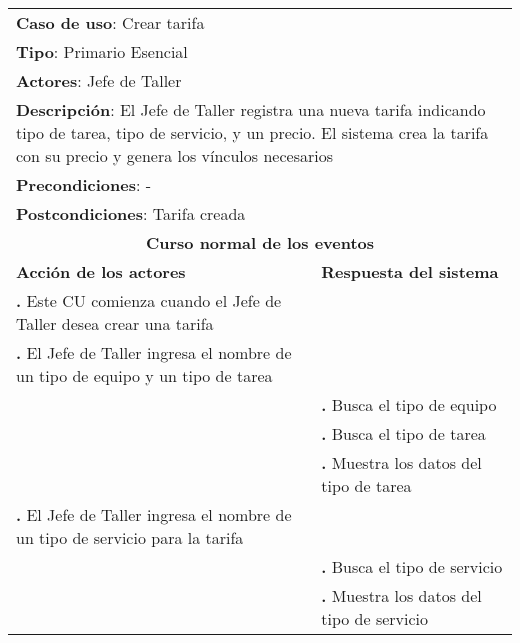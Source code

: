 \documentclass[12pt]{extarticle}
\begin{document}
    \newcommand\inc{\stepcounter{step}\textbf{\thestep. }}
    \newcommand\resetinc{\setcounter{step}{0}}
    \newcommand\raya{\noindent\rule{169mm}{0.8mm}\\}


	\begin{longtable}{ |p{8cm}|p{8cm}| }
		\hline
		\multicolumn{2}{|p{16cm}|}{\textbf{Caso de uso}: Crear tarifa}\\
		\multicolumn{2}{|p{16cm}|}{\textbf{Tipo}: Primario Esencial}\\
		\multicolumn{2}{|p{16cm}|}{\textbf{Actores}: Jefe de Taller}\\
		\multicolumn{2}{|p{16cm}|}{\textbf{Descripción}: El Jefe de Taller registra una nueva tarifa indicando tipo de tarea, tipo de servicio, y un precio. El sistema crea la tarifa con su precio y genera los vínculos necesarios}\\
		\multicolumn{2}{|p{16cm}|}{\textbf{Precondiciones}: -}\\
		\multicolumn{2}{|p{16cm}|}{\textbf{Postcondiciones}: Tarifa creada}\\
		\hline
		\multicolumn{2}{|c|}{\textbf{Curso normal de los eventos}}\\
		\hline
		\textbf{Acción de los actores} & \textbf{Respuesta del sistema}\\
		\hline

			\inc Este CU comienza cuando el Jefe de Taller desea crear una tarifa& \\
			\hline
            \inc El Jefe de Taller ingresa el nombre de un tipo de equipo y un tipo de tarea& \\
			\hline
            & \inc Busca el tipo de equipo \\
			\hline
			& \inc Busca el tipo de tarea \\
			\hline


			& \inc Muestra los datos del tipo de tarea \\
			\hline
            \inc El Jefe de Taller ingresa el nombre de un tipo de servicio para la tarifa &\\
			\hline
            & \inc Busca el tipo de servicio \\
			\hline
			& \inc Muestra los datos del tipo de servicio \\
			\hline



\end{longtable}
\end{document}
